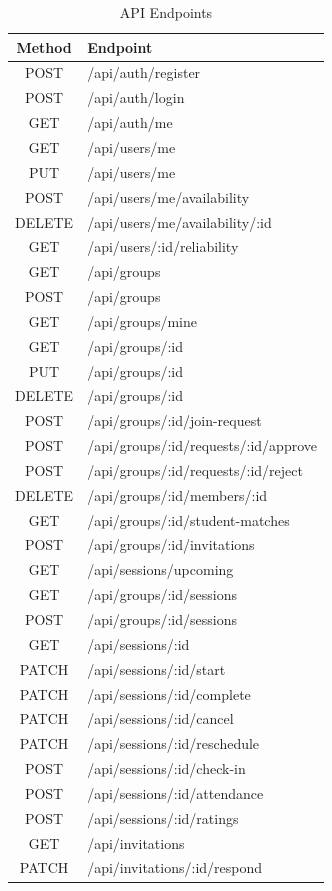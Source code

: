 \documentclass[conference]{IEEEtran}
\begin{document}
\begin{table}[htbp]
\caption{API Endpoints}
\label{tab:api}
\begin{center}
\begin{tabular}{|c|>{\raggedright\arraybackslash}p{4.4cm}|}
\hline
\textbf{Method} & \textbf{Endpoint} \\
\hline
POST & /api/auth/register \\
POST & /api/auth/login \\
GET  & /api/auth/me \\
\hline
GET  & /api/users/me \\
PUT  & /api/users/me \\
POST & /api/users/me/availability \\
DELETE & /api/users/me/availability/:id \\
GET  & /api/users/:id/reliability \\
\hline
GET  & /api/groups \\
POST & /api/groups \\
GET  & /api/groups/mine \\
GET  & /api/groups/:id \\
PUT  & /api/groups/:id \\
DELETE & /api/groups/:id \\
POST & /api/groups/:id/join-request \\
POST & /api/groups/:id/requests/:id/approve \\
POST & /api/groups/:id/requests/:id/reject \\
DELETE & /api/groups/:id/members/:id \\
GET  & /api/groups/:id/student-matches \\
POST & /api/groups/:id/invitations \\
\hline
GET  & /api/sessions/upcoming \\
GET  & /api/groups/:id/sessions \\
POST & /api/groups/:id/sessions \\
GET  & /api/sessions/:id \\
PATCH & /api/sessions/:id/start \\
PATCH & /api/sessions/:id/complete \\
PATCH & /api/sessions/:id/cancel \\
PATCH & /api/sessions/:id/reschedule \\
POST & /api/sessions/:id/check-in \\
POST & /api/sessions/:id/attendance \\
POST & /api/sessions/:id/ratings \\
\hline
GET  & /api/invitations \\
PATCH & /api/invitations/:id/respond \\
\hline
\end{tabular}
\end{center}
\end{table}
\end{document}
